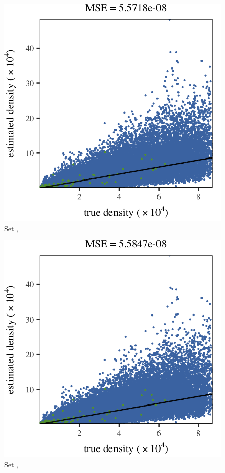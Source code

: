 \subfigvspace
\begin{subfigure}{0.3\textwidth}
	\centering
	\includegraphics[keepaspectratio=true, width=\textwidth, height=0.23\textheight]{result/img/results_baakman_5_60000_mbe_silverman}
	\caption{Set \baakmanFive, \mbe}
	\label{fig:results:singlesphere:mbe:baakman5}
\end{subfigure}
\begin{subfigure}{0.3\textwidth}
	\centering
	\includegraphics[keepaspectratio=true, width=\textwidth, height=0.23\textheight]{result/img/results_baakman_5_60000_sambe_silverman}
	\caption{Set \baakmanFive, \sambe}
	\label{fig:results:singlesphere:sambe:baakman5}
\end{subfigure}	